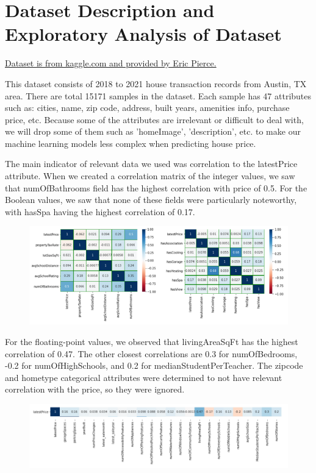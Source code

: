 \documentclass[12pt]{article}
\begin{document}
	\section{Dataset Description and Exploratory Analysis of Dataset}
	
	\href{https://www.kaggle.com/ericpierce/austinhousingprices}{Dataset is from kaggle.com and provided by Eric Pierce.} 
	
	This dataset consists of 2018 to 2021 house transaction records from Austin, TX area. There are total 15171 samples in the dataset. Each sample has 47 attributes such as: cities, name, zip code, address, built years, amenities info, purchase price, etc. Because some of the attributes are irrelevant or difficult to deal with, we will drop some of them such as 'homeImage', 'description', etc. to make our machine learning models less complex when predicting house price. 
	
	The main indicator of relevant data we used was correlation to the latestPrice attribute. When we created a correlation matrix of the integer values, we saw that numOfBathrooms field has the highest correlation with price of 0.5. For the Boolean values, we saw that none of these fields were particularly noteworthy, with hasSpa having the highest correlation of 0.17.
	
	\begin{figure}[H]
		\label{fig:fig2}
		\includegraphics[width=1\linewidth]{fig2}
	\end{figure}
	
	For the floating-point values, we observed that livingAreaSqFt has the highest correlation of 0.47. The other closest correlations are 0.3 for numOfBedrooms, -0.2 for numOfHighSchools, and 0.2 for medianStudentPerTeacher. The zipcode and hometype categorical attributes were determined to not have relevant correlation with the price, so they were ignored.
	
	\begin{figure}[H]
		\label{fig:fig3}
		\includegraphics[width=1\linewidth]{fig3recreate}
	\end{figure}
	
\end{document}
